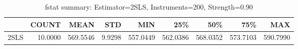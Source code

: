 \begin{table}[ht]
\centering
\caption{fstat summary: Estimator=2SLS, Instruments=200, Strength=0.90}
\begin{tabular}{lrrrrrrrr}
\toprule
 & COUNT & MEAN & STD & MIN & 25\% & 50\% & 75\% & MAX \\
\midrule
2SLS & 10.0000 & 569.5546 & 9.9298 & 557.0449 & 562.0386 & 568.0352 & 573.7103 & 590.7990 \\
\bottomrule
\end{tabular}
\end{table}
